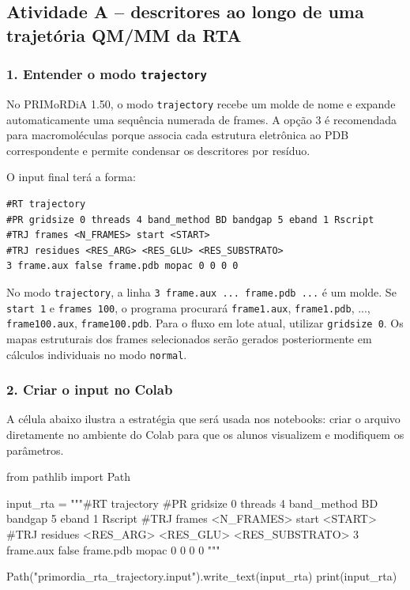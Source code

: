 \documentclass[a4paper,11pt]{refart}
\newcommand{\code}[1]{\texttt{#1}}
\begin{document}
\subsection{Atividade A -- descritores ao longo de uma trajetória QM/MM da RTA}

\subsubsection{1. Entender o modo \texttt{trajectory}}

No PRIMoRDiA 1.50, o modo \code{trajectory} recebe um molde de nome e expande automaticamente uma sequência numerada de frames. A opção 3 é recomendada para macromoléculas porque associa cada estrutura eletrônica ao PDB correspondente e permite condensar os descritores por resíduo.

O input final terá a forma:

\begin{lstlisting}[caption={Modelo de input do PRIMoRDiA 1.50 para a trajetória da RTA},label={primordia_rta_traj}]
#RT trajectory
#PR gridsize 0 threads 4 band_method BD bandgap 5 eband 1 Rscript
#TRJ frames <N_FRAMES> start <START>
#TRJ residues <RES_ARG> <RES_GLU> <RES_SUBSTRATO>
3 frame.aux false frame.pdb mopac 0 0 0 0
\end{lstlisting}

\begin{comentariobox}
No modo \code{trajectory}, a linha \code{3 frame.aux ... frame.pdb ...} é um molde. Se \code{start 1} e \code{frames 100}, o programa procurará \code{frame1.aux}, \code{frame1.pdb}, ..., \code{frame100.aux}, \code{frame100.pdb}. Para o fluxo em lote atual, utilizar \code{gridsize 0}. Os mapas estruturais dos frames selecionados serão gerados posteriormente em cálculos individuais no modo \code{normal}.
\end{comentariobox}

\subsubsection{2. Criar o input no Colab}

A célula abaixo ilustra a estratégia que será usada nos notebooks: criar o arquivo diretamente no ambiente do Colab para que os alunos visualizem e modifiquem os parâmetros.

\begin{pythoncell}
from pathlib import Path

input_rta = """#RT trajectory
#PR gridsize 0 threads 4 band_method BD bandgap 5 eband 1 Rscript
#TRJ frames <N_FRAMES> start <START>
#TRJ residues <RES_ARG> <RES_GLU> <RES_SUBSTRATO>
3 frame.aux false frame.pdb mopac 0 0 0 0
"""

Path("primordia_rta_trajectory.input").write_text(input_rta)
print(input_rta)
\end{pythoncell}
\end{document}
